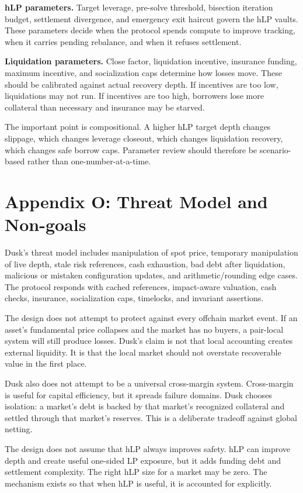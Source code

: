\documentclass[11pt]{article}
\begin{document}
\textbf{hLP parameters.} Target leverage, pre-solve threshold, bisection iteration budget, settlement divergence, and emergency exit haircut govern the hLP vaults. These parameters decide when the protocol spends compute to improve tracking, when it carries pending rebalance, and when it refuses settlement.

\textbf{Liquidation parameters.} Close factor, liquidation incentive, insurance funding, maximum incentive, and socialization caps determine how losses move. These should be calibrated against actual recovery depth. If incentives are too low, liquidations may not run. If incentives are too high, borrowers lose more collateral than necessary and insurance may be starved.

The important point is compositional. A higher hLP target depth changes slippage, which changes leverage closeout, which changes liquidation recovery, which changes safe borrow caps. Parameter review should therefore be scenario-based rather than one-number-at-a-time.

\section{Appendix O: Threat Model and Non-goals}

Dusk's threat model includes manipulation of spot price, temporary manipulation of live depth, stale risk references, cash exhaustion, bad debt after liquidation, malicious or mistaken configuration updates, and arithmetic/rounding edge cases. The protocol responds with cached references, impact-aware valuation, cash checks, insurance, socialization caps, timelocks, and invariant assertions.

The design does not attempt to protect against every offchain market event. If an asset's fundamental price collapses and the market has no buyers, a pair-local system will still produce losses. Dusk's claim is not that local accounting creates external liquidity. It is that the local market should not overstate recoverable value in the first place.

Dusk also does not attempt to be a universal cross-margin system. Cross-margin is useful for capital efficiency, but it spreads failure domains. Dusk chooses isolation: a market's debt is backed by that market's recognized collateral and settled through that market's reserves. This is a deliberate tradeoff against global netting.

The design does not assume that hLP always improves safety. hLP can improve depth and create useful one-sided LP exposure, but it adds funding debt and settlement complexity. The right hLP size for a market may be zero. The mechanism exists so that when hLP is useful, it is accounted for explicitly.
\end{document}
